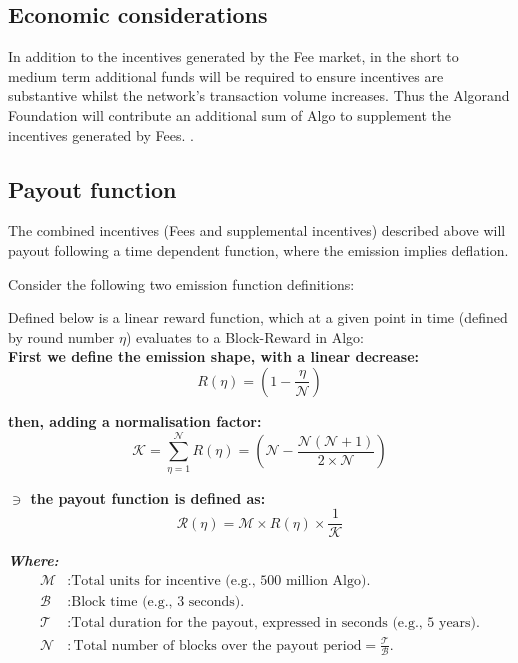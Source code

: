 \documentclass[11pt,a4paper]{article}
\begin{document}
\subsection{Economic considerations}
In addition to the incentives generated by the Fee market, in the short to medium term additional funds will be required
to ensure incentives are substantive whilst the network's transaction volume increases. Thus the Algorand Foundation 
will contribute an additional sum of Algo to supplement the incentives generated by Fees.
.
\pagebreak

\subsection{Payout function}
The combined incentives (Fees and supplemental incentives) described above will payout following a time dependent 
function, where the emission implies deflation.

Consider the following two emission function definitions:

Defined below is a linear reward function, which at a given point in time (defined by round number $\eta$) evaluates to 
a \gls{Block-Reward} in Algo:\\

\textbf{First we define the emission shape, with a linear decrease:}
\[
R(\eta) = (1- \frac{\eta}{\mathcal{N}})
\]

\textbf{then, adding a normalisation factor:}
\[
\mathcal{K} = \sum_{\eta=1}^\mathcal{N}R(\eta)=(\mathcal{N} -  \frac{\mathcal{N}(\mathcal{N}+1)}{2\times \mathcal{N}})  
\]

\textbf{$\ni$ the payout function is defined as:}
\[
\mathcal{R}(\eta) = \mathcal{M} \times R(\eta) \times \frac{1}{\mathcal{K}}
\]

\textbf{\emph{Where:}}
\begin{align*}
    \mathcal{M} & : \text{Total units for incentive (e.g., 500 million Algo).} \\
    \mathcal{B} & : \text{Block time (e.g., 3 seconds).} \\
    \mathcal{T} & : \text{Total duration for the payout, expressed in seconds (e.g., 5 years).} \\
    \mathcal{N} & : \text{Total number of blocks over the payout period} = \frac{\mathcal{T}}{\mathcal{B}}.\\
\end{align*}
\end{document}
